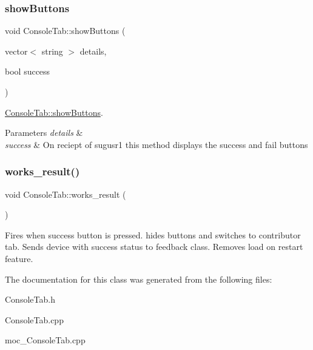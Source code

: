 \subsubsection{\texorpdfstring{show\+Buttons}{showButtons}}
{\footnotesize\ttfamily void Console\+Tab\+::show\+Buttons (\begin{DoxyParamCaption}\item[{vector$<$ string $>$}]{details,  }\item[{bool}]{success }\end{DoxyParamCaption})\hspace{0.3cm}{\ttfamily [slot]}}



\hyperlink{classConsoleTab_abda9ef659782544e72f0e4561c5583f0}{Console\+Tab\+::show\+Buttons}. 


\begin{DoxyParams}{Parameters}
{\em details} & \\
\hline
{\em success} & On reciept of sugusr1 this method displays the success and fail buttons \\
\hline
\end{DoxyParams}
\mbox{\label{classConsoleTab_a866367073a3150527988f7cb841d5002}} 
\subsubsection{\texorpdfstring{works\+\_\+result()}{works\_result()}}
{\footnotesize\ttfamily void Console\+Tab\+::works\+\_\+result (\begin{DoxyParamCaption}{ }\end{DoxyParamCaption})}

Fires when success button is pressed. hides buttons and switches to contributor tab. Sends device with success status to feedback class. Removes load on restart feature. 

The documentation for this class was generated from the following files\+:\begin{DoxyCompactItemize}
\item 
Console\+Tab.\+h\item 
Console\+Tab.\+cpp\item 
moc\+\_\+\+Console\+Tab.\+cpp\end{DoxyCompactItemize}
